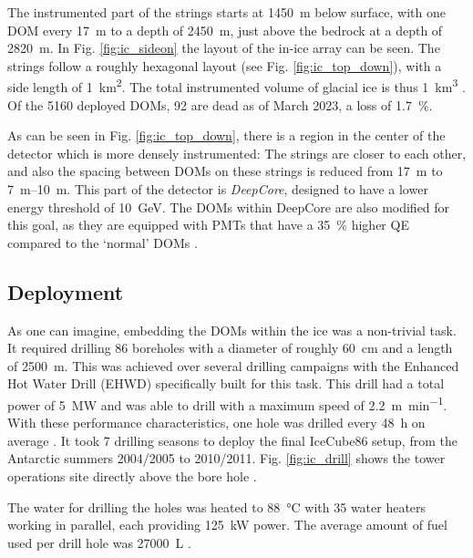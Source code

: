 The instrumented part of the strings starts at \SI{1450}{\m} below surface, with one DOM every \SI{17}{\m} to a depth of \SI{2450}{\m}, just above the bedrock at a depth of \SI{2820}{\m}. In Fig. \ref{fig:ic_sideon} the layout of the in-ice array can be seen. The strings follow a roughly hexagonal layout (see Fig. \ref{fig:ic_top_down}), with a side length of \SI{1}{\km\squared}. The total instrumented volume of glacial ice is thus \SI{1}{\km\cubed} \cite{Aartsen2017}. Of the 5160 deployed DOMs, 92 are dead as of March 2023, a loss of \SI{1.7}{\percent}.

As can be seen in Fig. \ref{fig:ic_top_down}, there is a region in the center of the detector which is more densely instrumented: The strings are closer to each other, and also the spacing between DOMs on these strings is reduced from \SI{17}{\m} to \SIrange{7}{10}{\m}. This part of the detector is \textit{DeepCore}, designed to have a lower energy threshold of \SI{10}{\GeV}. The DOMs within DeepCore are also modified for this goal, as they are equipped with PMTs that have a \SI{35}{\percent} higher QE compared to the `normal' DOMs \cite{Aartsen2017}. 


\subsection{Deployment} 
As one can imagine, embedding the DOMs within the ice was a non-trivial task. It required drilling 86 boreholes with a diameter of roughly \SI{60}{\cm} and a length of \SI{2500}{\m}. This was achieved over several drilling campaigns with the Enhanced Hot Water Drill (EHWD) specifically built for this task. This drill had a total power of \SI{5}{\mega\W} and was able to drill with a maximum speed of \SI{2.2}{\meter\per\minute}. With these performance characteristics, one hole was drilled every \SI{48}{\hour} on average \cite{Aartsen2017}. It took 7 drilling seasons to deploy the final IceCube86 setup, from the Antarctic summers 2004/2005 to 2010/2011. Fig. \ref{fig:ic_drill} shows the tower operations site directly above the bore hole .

The water for drilling the holes was heated to \SI{88}{\celsius} with 35 water heaters working in parallel, each providing \SI{125}{\kilo\W} power. The average amount of fuel used per drill hole was \SI{27000}{\liter} \cite{Benson2014}. 


